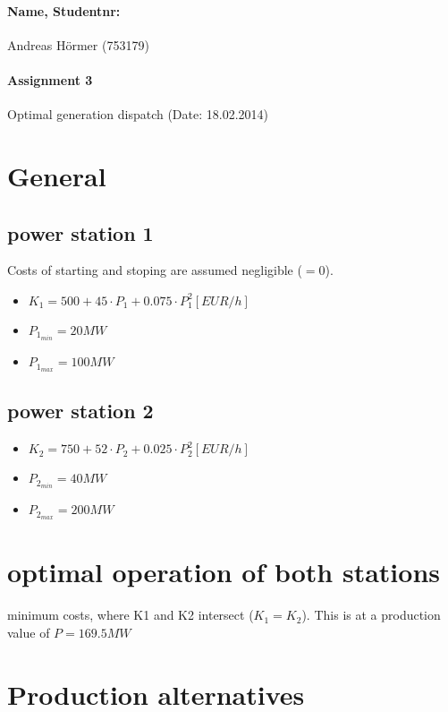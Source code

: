\documentclass{article}
\begin{document}
	\paragraph{Name, Studentnr: }Andreas H\"ormer (753179)
	\paragraph{Assignment 3}Optimal generation dispatch (Date: 18.02.2014)
	\section{General}
		\subsection{power station 1}
			Costs of starting and stoping are assumed negligible ($=0$).
			\begin{itemize}
				\item $K_1=500+45\cdot P_1+0.075\cdot P_1^2 [EUR/h]$
				\item $P_{1_{min}}=20MW$
				\item $P_{1_{max}}=100MW$
			\end{itemize}
		\subsection{power station 2}
			\begin{itemize}
				\item $K_2=750+52\cdot P_2+0.025\cdot P_2^2 [EUR/h]$
				\item $P_{2_{min}}=40MW$
				\item $P_{2_{max}}=200MW$
			\end{itemize}
	\section{optimal operation of both stations}
		minimum costs, where K1 and K2 intersect ($K_1=K_2$). This is at a production value of $P=169.5MW$
	\section{Production alternatives}
\end{document}
